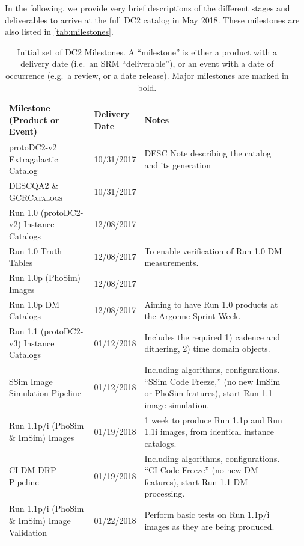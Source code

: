 \documentclass[preprint,times]{aastex61}
\begin{document}
In the following, we provide very brief descriptions of the different stages and deliverables to arrive at the full DC2 catalog in May 2018. These milestones are also listed in \autoref{tab:milestones}.

\begin{table}[!htb]
  \centering
  \caption{Initial set of DC2 Milestones. A ``milestone'' is either a product with a delivery date (i.e.\ an SRM ``deliverable''), or an event with a date of occurrence (e.g.\ a review, or a date release). Major milestones are marked in bold.}
  \label{tab:milestones}
   \fontsize{9pt}{10.5pt}\selectfont 
  \begin{tabular}{|L{0.3\linewidth}|C{0.11\linewidth}|L{0.53\linewidth}|}
    \hline 
    Milestone (Product or Event)             & Delivery Date & Notes \\
    \hline\hline
    protoDC2-v2 Extragalactic Catalog        & 10/31/2017 & DESC Note describing the catalog and its generation\\
    DESCQA2 \& \textsc{GCRCatalogs}          & 10/31/2017 & \\
    Run 1.0 (protoDC2-v2) Instance Catalogs  & 12/08/2017 & \\ 
    Run 1.0 Truth Tables                     & 12/08/2017 & To enable verification of Run 1.0 DM measurements. \\
    Run 1.0p (PhoSim) Images                 & 12/08/2017 & \\
    Run 1.0p DM Catalogs                     & 12/08/2017 & Aiming to have Run 1.0 products at the Argonne Sprint Week. \\
    Run 1.1 (protoDC2-v3) Instance Catalogs  & 01/12/2018 & Includes the required 1) cadence and dithering, 2) time domain objects. \\
    SSim Image Simulation Pipeline           & 01/12/2018 & Including algorithms, configurations. ``SSim Code Freeze,'' (no new ImSim or PhoSim features), start Run 1.1 image simulation. \\
    Run 1.1p/i (PhoSim \& ImSim) Images         & 01/19/2018 & 1 week to produce Run 1.1p and Run 1.1i images, from identical instance catalogs. \\
    CI DM DRP Pipeline                       & 01/19/2018 & Including algorithms, configurations. ``CI Code Freeze'' (no new DM features), start Run 1.1 DM processing. \\
    Run 1.1p/i (PhoSim \& ImSim) Image Validation         & 01/22/2018 & Perform basic tests on Run 1.1p/i images as they are being produced. \\

\end{tabular}
\end{table}
\end{document}
